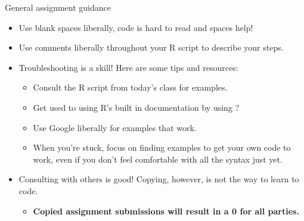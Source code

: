 \documentclass[
  8pt,
  ignorenonframetext,
  dvipsnames]{beamer}
\providecommand{\tightlist}{%
  \setlength{\itemsep}{0pt}\setlength{\parskip}{0pt}}
\renewcommand{\textbf}[1]{{\color{darkgray}\bfseries\fontfamily{Montserrat-TOsF}#1}}
\let\olditem\item
\renewcommand{\item}{%
  \olditem\vspace{4pt}
}
\begin{document}
\begin{frame}{General assignment guidance}
\protect\hypertarget{general-assignment-guidance}{}
\begin{itemize}
\tightlist
\item
  Use blank spaces liberally, code is hard to read and spaces help!
\item
  Use comments liberally throughout your R script to describe your
  steps.
\item
  Troubleshooting is a skill! Here are some tips and resources:

  \begin{itemize}
  \tightlist
  \item
    Consult the R script from today's class for examples.
  \item
    Get used to using R's built in documentation by using ?
  \item
    Use Google liberally for examples that work.
  \item
    When you're stuck, focus on finding examples to get your own code to
    work, even if you don't feel comfortable with all the syntax just
    yet.
  \end{itemize}
\item
  Consulting with others is good! Copying, however, is not the way to
  learn to code.

  \begin{itemize}
  \tightlist
  \item
    \textbf{Copied assignment submissions will result in a 0 for all
    parties.}
  \end{itemize}
\end{itemize}
\end{frame}
\end{document}
